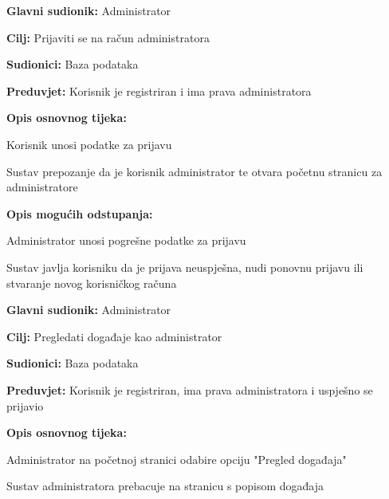 \noindent {}
\begin{packed_item}
	\item \textbf{Glavni sudionik:} Administrator
	\item  \textbf{Cilj:} Prijaviti se na račun administratora
	\item  \textbf{Sudionici:} Baza podataka
	\item  \textbf{Preduvjet:} Korisnik je registriran i ima prava administratora
	\item  \textbf{Opis osnovnog tijeka:}
	
	\item[] \begin{packed_enum}
		
		\item Korisnik unosi podatke za prijavu
		\item Sustav prepozanje da je korisnik administrator te otvara početnu stranicu za administratore
	\end{packed_enum}
	
	\item  \textbf{Opis mogućih odstupanja:}
	
	\item[] \begin{packed_item}
		
		\item[1.a] Administrator unosi pogrešne podatke za prijavu
		\item[] \begin{packed_enum}
			
			\item Sustav javlja korisniku da je prijava neuspješna, nudi ponovnu prijavu ili stvaranje
			novog korisničkog računa
			
		\end{packed_enum}
	\end{packed_item}
\end{packed_item}


\noindent {}
\begin{packed_item}
	\item \textbf{Glavni sudionik:} Administrator
	\item  \textbf{Cilj:} Pregledati događaje kao administrator
	\item  \textbf{Sudionici:} Baza podataka
	\item  \textbf{Preduvjet:} Korisnik je registriran, ima prava administratora i uspješno se prijavio
	\item  \textbf{Opis osnovnog tijeka:}
	
	\item[] \begin{packed_enum}
		
		\item Administrator na početnoj stranici odabire opciju "Pregled događaja"
		\item Sustav administratora prebacuje na stranicu s popisom događaja
	\end{packed_enum}
	
\end{packed_item}



